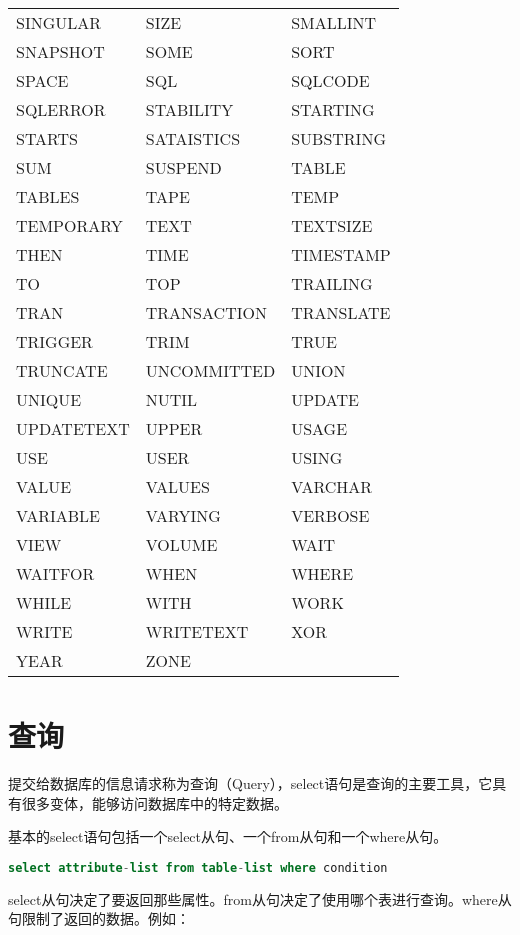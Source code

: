 \begin{longtable}{m{120pt}m{120pt}m{120pt}}
SINGULAR					&SIZE				&SMALLINT\\
SNAPSHOT					&SOME				&SORT\\
SPACE						&SQL				&	SQLCODE\\
SQLERROR					&STABILITY			&STARTING\\
STARTS						&SATAISTICS		&	SUBSTRING\\
SUM						&SUSPEND			&TABLE\\
TABLES						&TAPE				&TEMP\\
TEMPORARY				&TEXT				&TEXTSIZE\\
THEN						&TIME				&TIMESTAMP\\
TO							&TOP				&	TRAILING\\
TRAN						&TRANSACTION	&	TRANSLATE\\
TRIGGER					&TRIM				&TRUE\\
TRUNCATE					&UNCOMMITTED	&	UNION\\
UNIQUE						&NUTIL				&UPDATE\\
UPDATETEXT				&UPPER			&	USAGE\\
USE							&USER				&USING\\
VALUE						&VALUES			&	VARCHAR\\
VARIABLE					&VARYING			&VERBOSE\\
VIEW						&VOLUME			&WAIT\\
WAITFOR					&WHEN			&	WHERE\\
WHILE						&WITH				&WORK\\
WRITE						&WRITETEXT		&	XOR\\
YEAR						&ZONE	&\\
\end{longtable}






\chapter{查询}


提交给数据库的信息请求称为查询（Query），select语句是查询的主要工具，它具有很多变体，能够访问数据库中的特定数据。

基本的select语句包括一个select从句、一个from从句和一个where从句。

\begin{lstlisting}[language=SQL]
select attribute-list from table-list where condition
\end{lstlisting}

select从句决定了要返回那些属性。from从句决定了使用哪个表进行查询。where从句限制了返回的数据。例如：

